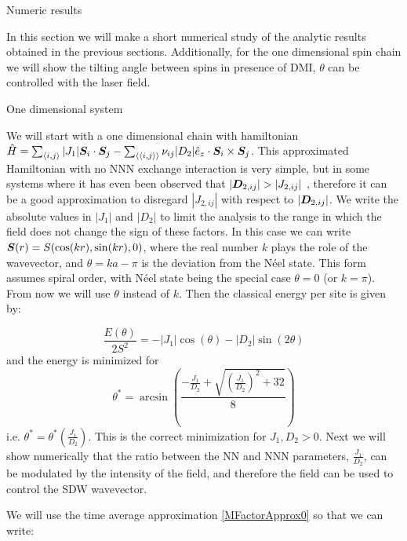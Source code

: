 \begin{section}{Numeric results}
\label{Numerics}

In this section we will make a short numerical study of the analytic results obtained in the previous sections. Additionally, for the one dimensional spin chain we will show the tilting angle between spins in presence of DMI, $\theta$ can be controlled with the laser field. 

\begin{subsection}{One dimensional system}

We will start with a one dimensional chain with hamiltonian $\hat{H} = \sum_{\langle i,j \rangle} |J_1| \boldsymbol{S}_i\cdot\boldsymbol{S}_j - \sum_{\langle \langle i,j \rangle \rangle} \nu_{ij}|D_2|\hat{e}_z\cdot\boldsymbol{S}_i \times \boldsymbol{S}_j$. This approximated Hamiltonian with no NNN exchange interaction is very simple, but in some systems where it has even been observed that $|\boldsymbol{D}_{2,ij}| > |J_{2,ij}|$ \cite{Chen2018}, therefore it can be a good approximation to disregard  $|J_{2,ij}|$ with respect to $|\boldsymbol{D}_{2,ij}|$.  We write the absolute values in $|J_1|$ and $|D_2|$ to limit the analysis to the range in which the field does not change the sign of these factors. In this case we can write $\boldsymbol{S}(r) = S(\cos(kr), \sin(kr), 0)$, where the real number $k$ plays the role of the wavevector, and $\theta = ka-\pi$ is the deviation from the N\'eel state. This form assumes spiral order, with N\'eel state being the special case $\theta = 0$ (or $k = \pi$). From now we will use $\theta$ instead of $k$. Then the classical energy per site is given by:

\begin{equation}
\frac{E(\theta)}{2S^2} = -|J_1|\cos(\theta) - |D_2|\sin(2 \theta)
\end{equation}
and the energy is minimized for 
\begin{equation}
\theta^* = \arcsin(\frac{-\frac{J_1}{D_2} + \sqrt{(\frac{J_1}{D_2})^2+32}}{8})
\end{equation}
i.e. $\theta^* = \theta^*(\frac{J_1}{D_2})$. This is the correct minimization for $J_1, D_2 > 0$. Next we will show numerically that the ratio between the NN and NNN parameters, $\frac{J_1}{D_2}$, can be modulated by the intensity of the field, and therefore the field can be used to control the SDW wavevector. 

We will use the time average approximation \ref{MFactorApprox0} so that we can write:


\end{subsection}
\end{section}

